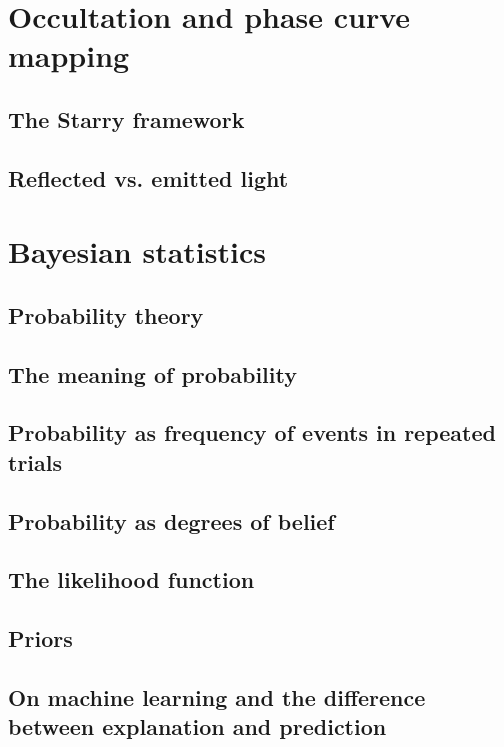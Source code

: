 \documentclass[12pt]{report}
\begin{document}
\section{Occultation and phase curve mapping}
\label{sec:occultations}
\subsection{The Starry framework}
\subsection{Reflected vs. emitted light}

\section{Bayesian statistics}
\label{sec:bayes}
\subsection{Probability theory}
\subsection{The meaning of probability}
\subsection{Probability as frequency of events in repeated trials}
\subsection{Probability as degrees of belief}
\subsection{The likelihood function}
\subsection{Priors}
\subsection{On machine learning and the difference between explanation and prediction}
\end{document}
